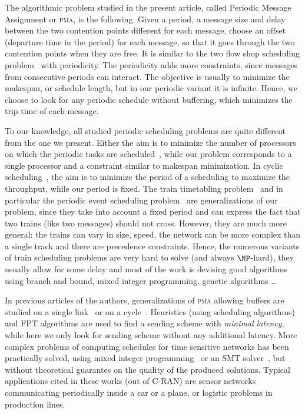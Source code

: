 \documentclass[a4paper,UKenglish,cleveref, autoref, thm-restate]{lipics-v2019}
\newcommand\pma{\textsc{pma}\xspace}
\begin{document}
The algorithmic problem studied in the present article, called Periodic Message Assignment or \pma, is the following.
Given a period, a message size and delay between the two contention points different for each message, choose an offset (departure time in the period) for each message, so that it goes through the two contention points when they are free. It is  similar to the two flow shop scheduling problem~\cite{yu2004minimizing} with periodicity. The periodicity adds more constraints, since messages from consecutive periods can interact. The objective is usually to minimize the makespan, or schedule length, but in our periodic variant it is infinite. Hence, we choose to look for any periodic schedule without buffering, which minimizes the trip time of each message. 


 To our knowledge, all studied periodic scheduling problems are quite different from the one we present.
Either the aim is to minimize the number of processors on which the periodic tasks are scheduled~\cite{korst1991periodic,hanen1993cyclic}, while our problem corresponds to a single processor and a constraint similar to makespan minimization. In cyclic scheduling~\cite{levner2010complexity}, the aim is to minimize the period of a scheduling to maximize the throughput, while our period is fixed. The train timetabling problem~\cite{lusby2011railway} and in particular the periodic event scheduling problem~\cite{serafini1989mathematical} are generalizations of our problem, since they take into account 
a fixed period and can express the fact that two trains (like two messages) should not cross. However, they are much more general: the trains can vary in size, speed, the network can be more complex than a single track and there are precedence constraints. Hence, the numerous variants of train scheduling problems are very hard to solve (and always $\NP$-hard), they usually allow for some delay and most of the work is devising good algorithms using branch and bound, mixed integer programming, genetic algorithms \dots~\cite{lusby2011railway}


In previous articles of the authors, generalizations of \pma allowing buffers are studied on a single link~\cite{dominique2018deterministic} or on a cycle~\cite{Guir1905:Deterministic}. Heuristics (using scheduling algorithms) and FPT algorithms are used to find a sending scheme with \emph{minimal latency}, while here we only look for sending scheme without any additional latency. More complex problems of computing schedules for time sensitive networks has been practically solved, using mixed integer programming~\cite{nayak2017incremental,steiner2018traffic} or an SMT solver~\cite{dos2019tsnsched}, but without theoretical guarantes on the quality of the produced solutions. Typical applications cited in these works (out of C-RAN) are sensor networks communicating periodically inside a car or a plane, or logistic problems in production lines.
\end{document}
